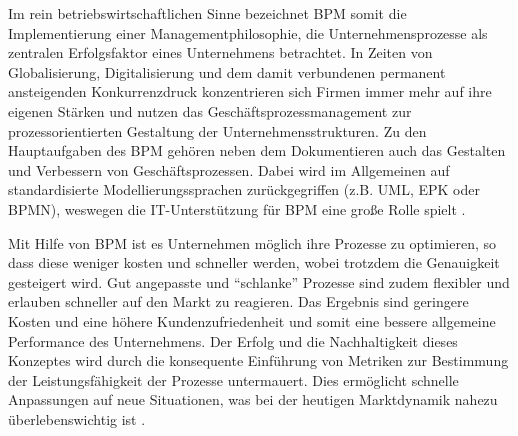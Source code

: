 \documentclass[a4paper,12pt]{report}
\begin{document}
Im rein betriebswirtschaftlichen Sinne bezeichnet \ac{BPM} somit die Implementierung einer Managementphilosophie, die Unternehmensprozesse als zentralen Erfolgsfaktor eines Unternehmens betrachtet. In Zeiten von Globalisierung, Digitalisierung und dem damit verbundenen permanent ansteigenden Konkurrenzdruck konzentrieren sich Firmen immer mehr auf ihre eigenen Stärken und nutzen das Geschäftsprozessmanagement zur prozessorientierten Gestaltung der Unternehmensstrukturen. Zu den Hauptaufgaben des \ac{BPM} gehören neben dem Dokumentieren auch das Gestalten und Verbessern von Geschäftsprozessen. Dabei wird im Allgemeinen auf standardisierte Modellierungssprachen zurückgegriffen (z.B. UML, EPK oder BPMN), weswegen die IT-Unterstützung für \ac{BPM} eine große Rolle spielt \citep[vgl.][S. 1ff.]{Becker2009}. 

Mit Hilfe von \ac{BPM} ist es Unternehmen möglich ihre Prozesse zu optimieren, so dass diese weniger kosten und schneller werden, wobei trotzdem die Genauigkeit gesteigert wird. Gut angepasste und "`schlanke"' Prozesse sind zudem flexibler und erlauben schneller auf den Markt zu reagieren. Das Ergebnis sind geringere Kosten und eine höhere Kundenzufriedenheit und somit eine bessere allgemeine Performance des Unternehmens. Der Erfolg und die Nachhaltigkeit dieses Konzeptes wird durch die konsequente Einführung von Metriken zur Bestimmung der Leistungsfähigkeit der Prozesse untermauert. Dies ermöglicht schnelle Anpassungen auf neue Situationen, was bei der heutigen Marktdynamik nahezu überlebenswichtig ist \citep[vgl.][S. 7]{Brocke2014}.
\end{document}

